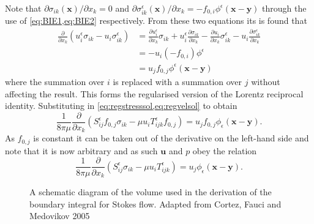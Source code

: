 Note that $\partial \sigma_{ik}(\bm{x})/ \partial x_k = 0$ and $\partial \sigma^\epsilon_{ik}(\bm{x})/ \partial x_k = -f_{0,i}\phi^\epsilon(\bm{x}-\bm{y})$ through the use of \cref{eq:BIE1,eq:BIE2} respectively. From these two equations its is found that
\begin{equation*}
\begin{aligned}
  \frac{\partial}{\partial x_k}(u^\epsilon_i\sigma_{ik} - u_i\sigma^\epsilon_{ik}) &=
  \frac{\partial u^\epsilon_i}{\partial x_k} \sigma_{ik} + u^\epsilon_i\frac{\partial \sigma_{ik}}{\partial x_k} - \frac{\partial u_i}{\partial x_k} \sigma^\epsilon_{ik} - u_i\frac{\partial \sigma^\epsilon_{ik}}{\partial x_k}  \\
  & = - u_i(-f_{0,i})\phi^\epsilon  \\
  &= u_j f_{0,j}\phi^\epsilon(\bm{x}-\bm{y})
\end{aligned}
\end{equation*}
where the summation over $i$ is replaced with a summation over $j$ without affecting the result. This forms the regularised version of the Lorentz reciprocal identity. Substituting in \cref{eq:regstresssol,eq:regvelsol} to obtain
\begin{equation*}
  \frac{1}{8\pi\mu}\frac{\partial}{\partial x_k}(S^\epsilon_{ij}f_{0,j}\sigma_{ik} - \mu u_i T^\epsilon_{ijk}f_{0,j}) = u_j f_{0,j}\phi_\epsilon(\bm{x}-\bm{y}).
\end{equation*}
As $f_{0,j}$ is constant it can be taken out of the derivative on the left-hand side and note that it is now arbitrary and as such $\bm{u}$ and $p$ obey the relation
\begin{equation}
  \label{eq:reciprocalrelation}
  \frac{1}{8\pi\mu}\frac{\partial}{\partial x_k}(S^\epsilon_{ij}\sigma_{ik} - \mu u_i T^\epsilon_{ijk}) = u_j\phi_\epsilon(\bm{x}-\bm{y}).
\end{equation}

\begin{figure}
    \centering
    \resizebox{.4\linewidth}{!}{}
    \caption{A schematic diagram of the volume used in the derivation of the boundary integral for Stokes flow. Adapted from Cortez, Fauci and Medovikov 2005 \cite{Cortez2005}}
    \label{fig:SystematicDiagram}
\end{figure}

